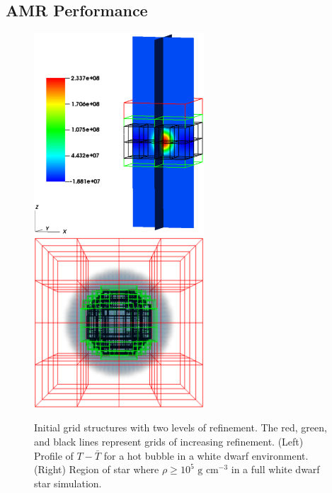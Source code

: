 \subsection{AMR Performance}

\begin{figure}[htb]
\begin{center}
\includegraphics[width=2.5in]{./figs/reacting_bubble_amr} \hspace{2.5em}
\includegraphics[width=2.5in]{./figs/wdconvect_amr_3grid}
\caption{\label{fig:amr_grids} Initial grid structures with two levels of refinement. 
         The red, green, and black lines represent grids of increasing refinement. 
         (Left) Profile of $T - \bar{T}$ for a hot bubble in a white dwarf environment.
         (Right) Region of star where $\rho\ge 10^5 \text{ g cm}^{-3}$ in a full white dwarf star simulation. }
\end{center}
\end{figure}

